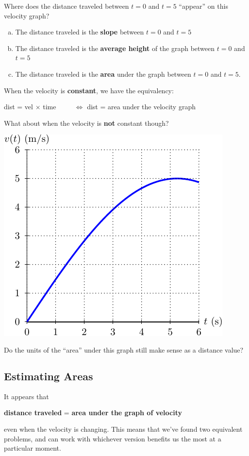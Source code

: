 Where does the distance traveled between $t=0$ and $t=5$ ``appear''
on this velocity graph?
\begin{enumerate}[(a)]
\item The distance traveled is the {\bf slope} between $t=0$ and $t=5$  \\[1ex]
\item The distance traveled is the {\bf average height} of the graph between $t=0$ and $t=5$  \\[1ex]
\item The distance traveled is the {\bf area} under the graph between $t=0$
  and $t=5$.
\end{enumerate}

\newpage

When the velocity is {\bf constant}, we have the equivalency:
\vspace{0.2in}
\begin{center}
dist = vel $\times$ time ~~~~ $\Longleftrightarrow$ dist = area under the velocity graph
\end{center}
\vspace{0.2in}

\problem 
What about when the velocity is {\bf not} constant though?

\begin{center}
\includegraphics[width=0.35\linewidth]{graphics/notes_04_variable_velocity}
\end{center}

Do the units of the ``area'' under this graph still make sense as a
distance value?


\vfill
\newpage
{}
\subsection*{Estimating Areas}

It appears that
\begin{center}
{\bf distance traveled} = {\bf area under the graph of velocity}
\end{center}
even when the velocity is changing.  This means that we've found two
equivalent problems, and
can work with whichever version benefits us the most at a particular moment. \\


